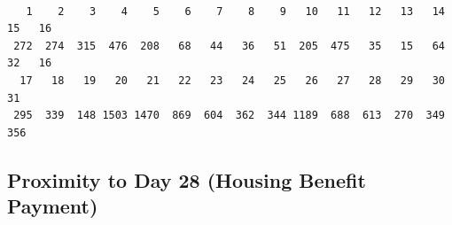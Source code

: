 \documentclass[
  letterpaper,
  DIV=11,
  numbers=noendperiod]{scrartcl}
\begin{document}
\begin{verbatim}

   1    2    3    4    5    6    7    8    9   10   11   12   13   14   15   16 
 272  274  315  476  208   68   44   36   51  205  475   35   15   64   32   16 
  17   18   19   20   21   22   23   24   25   26   27   28   29   30   31 
 295  339  148 1503 1470  869  604  362  344 1189  688  613  270  349  356 
\end{verbatim}

\hypertarget{proximity-to-day-28-housing-benefit-payment}{%
\subsection{Proximity to Day 28 (Housing Benefit
Payment)}\label{proximity-to-day-28-housing-benefit-payment}}
\end{document}
